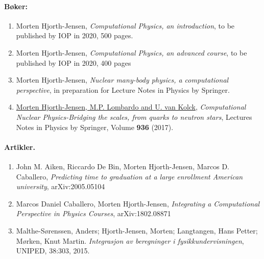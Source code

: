\documentclass[%
oneside,                 %
final,                   %
10pt]{article}
\begin{document}
\paragraph{Bøker:}
\begin{enumerate}
\item Morten Hjorth-Jensen, \emph{Computational Physics, an introduction}, to be published by IOP in 2020, 500 pages.

\item Morten Hjorth-Jensen, \emph{Computational Physics, an advanced course}, to be published by IOP in 2020, 400 pages

\item Morten Hjorth-Jensen, \emph{Nuclear many-body physics, a computational perspective}, in preparation for Lecture Notes in Physics by Springer.

\item \href{{http://www.springer.com/us/book/9783319533353}}{Morten Hjorth-Jensen, M.P. Lombardo and U. van Kolck}, \emph{Computational Nuclear Physics-Bridging the scales, from quarks to neutron stars}, Lectures Notes in Physics by Springer, Volume \textbf{936} (2017).
\end{enumerate}

\noindent
\paragraph{Artikler.}
\begin{enumerate}
\item John M. Aiken, Riccardo De Bin, Morten Hjorth-Jensen, Marcos D. Caballero, \emph{Predicting time to graduation at a large enrollment American university}, arXiv:2005.05104 

\item Marcos Daniel Caballero, Morten Hjorth-Jensen, \emph{Integrating a Computational Perspective in Physics Courses}, arXiv:1802.08871

\item Malthe-Sørenssen, Anders; Hjorth-Jensen, Morten; Langtangen, Hans Petter; Mørken, Knut Martin. \emph{Integrasjon av beregninger i fysikkundervisningen}, UNIPED, 38:303, 2015.
\end{enumerate}

\noindent

\end{document}

